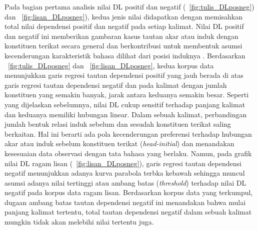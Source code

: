 Pada bagian pertama analisis nilai DL positif dan negatif (\pic~\ref{fig:tulis_DLposneg}) dan \pic~\ref{fig:lisan_DLposneg}), kedua jenis nilai didapatkan dengan memisahkan total nilai dependensi positif dan negatif pada setiap kalimat. Nilai DL positif dan negatif ini memberikan gambaran kasus tautan akar atau induk dengan konstituen terikat secara general dan berkontribusi untuk membentuk asumsi kecenderungan karakteristik bahasa dilihat dari posisi induknya \citep{wang2017effects}. Berdasarkan \pic~\ref{fig:tulis_DLposneg} dan \pic~\ref{fig:lisan_DLposneg}, kedua korpus data menunjukkan garis regresi tautan dependensi positif yang jauh berada di atas garis regresi tautan dependensi negatif dan pada kalimat dengan jumlah konstituen yang semakin banyak, jarak antara keduanya semakin besar. Seperti yang dijelaskan sebelumnya, nilai DL cukup sensitif terhadap panjang kalimat dan keduanya memiliki hubungan linear. Dalam sebuah kalimat, perbandingan jumlah bentuk relasi induk sebelum dan sesudah konstituen terikat saling berkaitan. Hal ini berarti ada pola kecenderungan preferensi terhadap hubungan akar atau induk sebelum konstituen terikat (\textit{head-initial}) dan menandakan kesesuaian data observasi dengan tata bahasa yang berlaku. Namun, pada grafik nilai DL ragam lisan (\pic~\ref{fig:lisan_DLposneg}), garis regresi tautan dependensi negatif menunjukkan adanya kurva parabola terbka kebawah sehingga muncul asumsi adanya nilai tertinggi atau ambang batas (\textit{threshold}) terhadap nilai DL negatif pada korpus data ragam lisan. Berdasarkan korpus data yang terkumpul, dugaan ambang batas tautan dependensi negatif ini menandakan bahwa mulai panjang kalimat tertentu, total tautan dependensi negatif dalam sebuah kalimat mungkin tidak akan melebihi nilai tertentu juga. 

